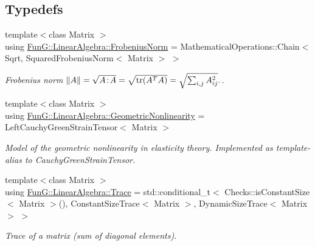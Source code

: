 \subsection*{Typedefs}
\begin{DoxyCompactItemize}
\item 
\hypertarget{group__LinearAlgebraGroup_gad209833e37a25e863fe72868d37795b8}{{\footnotesize template$<$class Matrix $>$ }\\using \hyperlink{group__LinearAlgebraGroup_gad209833e37a25e863fe72868d37795b8}{Fun\-G\-::\-Linear\-Algebra\-::\-Frobenius\-Norm} = Mathematical\-Operations\-::\-Chain$<$ Sqrt, Squared\-Frobenius\-Norm$<$ Matrix $>$ $>$}\label{group__LinearAlgebraGroup_gad209833e37a25e863fe72868d37795b8}

\begin{DoxyCompactList}\small\item\em Frobenius norm $ \|A\| = \sqrt{A\negthinspace : \negthinspace A }= \sqrt{\mathrm{tr}(A^TA)} = \sqrt{\sum_{i,j} A_{ij}^2}. $. \end{DoxyCompactList}\item 
\hypertarget{group__LinearAlgebraGroup_ga7af9b6f793f11a287277a30ea1e32caf}{{\footnotesize template$<$class Matrix $>$ }\\using \hyperlink{group__LinearAlgebraGroup_ga7af9b6f793f11a287277a30ea1e32caf}{Fun\-G\-::\-Linear\-Algebra\-::\-Geometric\-Nonlinearity} = Left\-Cauchy\-Green\-Strain\-Tensor$<$ Matrix $>$}\label{group__LinearAlgebraGroup_ga7af9b6f793f11a287277a30ea1e32caf}

\begin{DoxyCompactList}\small\item\em Model of the geometric nonlinearity in elasticity theory. Implemented as template-\/alias to Cauchy\-Green\-Strain\-Tensor. \end{DoxyCompactList}\item 
\hypertarget{group__LinearAlgebraGroup_ga43e327309edc349c75ceecd29b7abde2}{{\footnotesize template$<$class Matrix $>$ }\\using \hyperlink{group__LinearAlgebraGroup_ga43e327309edc349c75ceecd29b7abde2}{Fun\-G\-::\-Linear\-Algebra\-::\-Trace} = std\-::conditional\-\_\-t$<$ Checks\-::is\-Constant\-Size$<$ Matrix $>$(), Constant\-Size\-Trace$<$ Matrix $>$, Dynamic\-Size\-Trace$<$ Matrix $>$ $>$}\label{group__LinearAlgebraGroup_ga43e327309edc349c75ceecd29b7abde2}

\begin{DoxyCompactList}\small\item\em Trace of a matrix (sum of diagonal elements). \end{DoxyCompactList}\end{DoxyCompactItemize}
